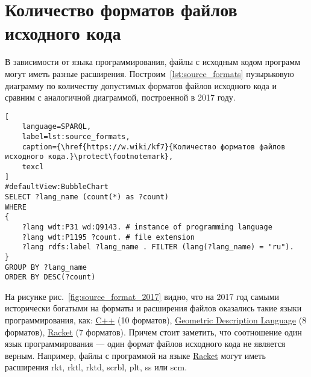 \section{Количество форматов файлов исходного кода}
В зависимости от языка программирования, файлы с исходным кодом программ могут иметь разные расширения. Построим~\ref{lst:source_formats} пузырьковую диаграмму по количеству допустимых форматов файлов исходного кода и сравним с аналогичной диаграммой, построенной в 2017 году.

\pagebreak
{}
\begin{lstlisting}[
	language=SPARQL,
	label=lst:source_formats,
	caption={\href{https://w.wiki/kf7}{Количество форматов файлов исходного кода.}\protect\footnotemark},
	texcl
]
#defaultView:BubbleChart
SELECT ?lang_name (count(*) as ?count)
WHERE
{
    ?lang wdt:P31 wd:Q9143. # instance of programming language
  	?lang wdt:P1195 ?count. # file extension
  	?lang rdfs:label ?lang_name . FILTER (lang(?lang_name) = "ru").
}
GROUP BY ?lang_name 
ORDER BY DESC(?count)
\end{lstlisting}

На рисунке рис.~\ref{fig:source_format_2017} видно, что на 2017 год самыми исторически богатыми на форматы и расширения файлов оказались такие языки программирования, как: \href{https://en.wikipedia.org/wiki/C++}{C++} (10 форматов), \href{https://en.wikipedia.org/wiki/Geometric_Description_Language}{Geometric Description Language} (8 форматов), \href{https://en.wikipedia.org/wiki/Racket_(programming_language)}{Racket} (7 форматов). Причем стоит заметить, что соотношение один язык программирования --- один формат файлов исходного кода не является верным. Например, файлы с программой на языке \href{https://en.wikipedia.org/wiki/Racket_(programming_language)}{Racket} могут иметь расширения rkt, rktl, rktd, scrbl, plt, ss или scm.

